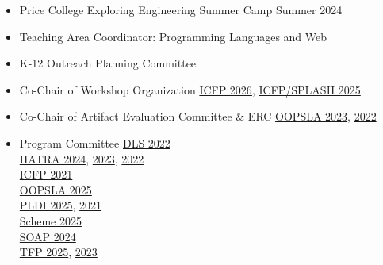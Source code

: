 \documentclass[11pt]{article}
\begin{document}

\begin{itemize}
  \item Price College Exploring Engineering Summer Camp \hfill Summer 2024
  \item {Teaching Area Coordinator: Programming Languages and Web} \hfill {}
  \item {K-12 Outreach Planning Committee} \hfill {}
\end{itemize}



\begin{itemize}
  \item {Co-Chair of Workshop Organization} \hfill \href{}{ICFP 2026}, \href{https://conf.researchr.org/committee/icfp-splash-2025/icfp-splash-2025-organizing-committee}{ICFP/SPLASH 2025}
  \item {Co-Chair of Artifact Evaluation Committee \& ERC} \hfill \href{https://2023.splashcon.org}{OOPSLA 2023}, \href{https://2022.splashcon.org}{2022}
  \item {Program Committee}
          \hfill \href{https://2022.splashcon.org/track/dls-2022-papers}{DLS 2022} \\
   \hbox{}\hfill \href{https://2024.splashcon.org/home/hatra-2024}{HATRA 2024}, \href{https://2023.splashcon.org/home/hatra-2023}{2023}, \href{https://2022.splashcon.org/home/hatra-2022}{2022} \\
   \hbox{}\hfill \href{https://icfp21.sigplan.org/committee/icfp-2021-papers-program-committee}{ICFP 2021} \\
   \hbox{}\hfill \href{https://2025.splashcon.org/committee/splash-2025-OOPSLA-oopsla-review-committee}{OOPSLA 2025} \\
   \hbox{}\hfill \href{https://pldi25.sigplan.org/committee/pldi-2025-papers-pldi-review-committee}{PLDI 2025}, \href{https://pldi21.sigplan.org/committee/pldi-2021-papers-program-committee}{2021} \\
   \hbox{}\hfill \href{}{Scheme 2025} \\
   \hbox{}\hfill \href{https://pldi24.sigplan.org/home/SOAP-2024}{SOAP 2024} \\
   \hbox{}\hfill \href{https://trendsfp.github.io/}{TFP 2025}, \href{https://trendsfp.github.io/2023/}{2023}


\end{itemize}
\end{document}
